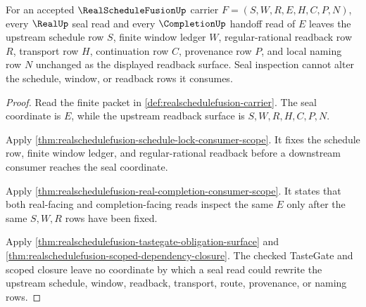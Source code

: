 \begin{theorem}
\label{thm:realschedulefusion-seal-schedule-noninterference}
For an accepted $\RealScheduleFusionUp$ carrier $F=(S,W,R,E,H,C,P,N)$, every $\RealUp$ seal read and every $\CompletionUp$ handoff read of $E$ leaves the upstream schedule row $S$, finite window ledger $W$, regular-rational readback row $R$, transport row $H$, continuation row $C$, provenance row $P$, and local naming row $N$ unchanged as the displayed readback surface. Seal inspection cannot alter the schedule, window, or readback rows it consumes.
\end{theorem}
\begin{proof}
Read the finite packet in \autoref{def:realschedulefusion-carrier}. The seal coordinate is $E$, while the upstream readback surface is $S,W,R,H,C,P,N$.

Apply \autoref{thm:realschedulefusion-schedule-lock-consumer-scope}. It fixes the schedule row, finite window ledger, and regular-rational readback before a downstream consumer reaches the seal coordinate.

Apply \autoref{thm:realschedulefusion-real-completion-consumer-scope}. It states that both real-facing and completion-facing reads inspect the same $E$ only after the same $S,W,R$ rows have been fixed.

Apply \autoref{thm:realschedulefusion-tastegate-obligation-surface} and \autoref{thm:realschedulefusion-scoped-dependency-closure}. The checked TasteGate and scoped closure leave no coordinate by which a seal read could rewrite the upstream schedule, window, readback, transport, route, provenance, or naming rows.
\end{proof}

